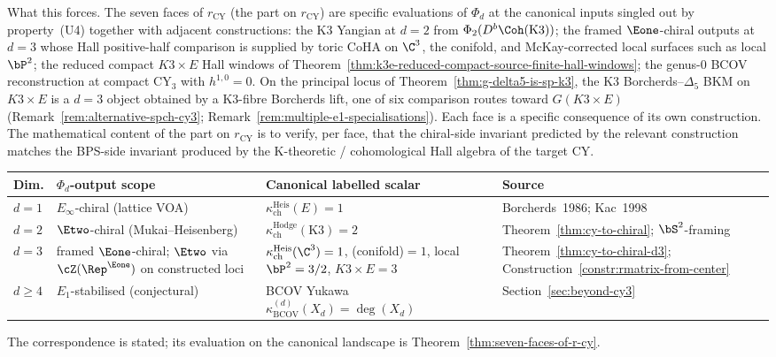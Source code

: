 What this forces. The seven faces of $r_{\mathrm{CY}}$ \textup{(}the part on $r_{\mathrm{CY}}$\textup{)} are specific evaluations of $\Phi_d$ at the canonical inputs singled out by property~\textup{(U4)} together with adjacent constructions: the K3 Yangian at $d = 2$ from $\Phi_2(D^b\Coh(\mathrm{K3}))$; the framed $\Eone$-chiral outputs at $d = 3$ whose Hall positive-half comparison is supplied by toric CoHA on $\C^3$, the conifold, and McKay-corrected local surfaces such as local $\bP^2$; the reduced compact \(K3\times E\) Hall windows of Theorem~\ref{thm:k3e-reduced-compact-source-finite-hall-windows}; the genus-$0$ BCOV reconstruction at compact CY$_3$ with $h^{1,0} = 0$. On the principal locus of Theorem~\ref{thm:g-delta5-is-sp-k3}, the K3 Borcherds--$\Delta_5$ BKM on $K3 \times E$ is a $d = 3$ object obtained by a K3-fibre Borcherds lift, one of six comparison routes toward \(G(K3 \times E)\) \textup{(}Remark~\ref{rem:alternative-spch-cy3}; Remark~\ref{rem:multiple-e1-specialisations}\textup{)}. Each face is a specific consequence of its own construction. The mathematical content of the part on $r_{\mathrm{CY}}$ is to verify, per face, that the chiral-side invariant predicted by the relevant construction matches the BPS-side invariant produced by the K-theoretic / cohomological Hall algebra of the target CY.
\begin{center}
\renewcommand{\arraystretch}{1.15}
\small
\begin{tabular}{lllp{4.2cm}}
 \toprule
 \textbf{Dim.} & \textbf{$\Phi_d$-output scope} & \textbf{Canonical labelled scalar} & \textbf{Source} \\
 \midrule
 $d = 1$ & $E_\infty$-chiral (lattice VOA) & $\kappa_{\mathrm{ch}}^{\mathrm{Heis}}(E) = 1$ & Borcherds~1986; Kac~1998 \\
 $d = 2$ & $\Etwo$-chiral (Mukai--Heisenberg) & $\kappa_{\mathrm{ch}}^{\mathrm{Hodge}}(\mathrm{K3}) = 2$ & Theorem~\ref{thm:cy-to-chiral}; $\bS^2$-framing \\
 $d = 3$ & framed $\Eone$-chiral; $\Etwo$ via $\cZ(\Rep^{\Eone})$ on constructed loci & $\kappa_{\mathrm{ch}}^{\mathrm{Heis}}(\C^3) = 1$, (conifold)$= 1$, local $\bP^2 = 3/2$, $K3\times E = 3$ & Theorem~\ref{thm:cy-to-chiral-d3}; \mbox{Construction~\ref{constr:rmatrix-from-center}} \\
 $d \geq 4$ & $E_1$-stabilised (conjectural) & BCOV Yukawa $\kappa_{\mathrm{BCOV}}^{(d)}(X_d) = \deg(X_d)$ & Section~\ref{sec:beyond-cy3} \\
 \bottomrule
\end{tabular}
\end{center}
\noindent The correspondence is stated; its evaluation on the canonical landscape is Theorem~\ref{thm:seven-faces-of-r-cy}.
